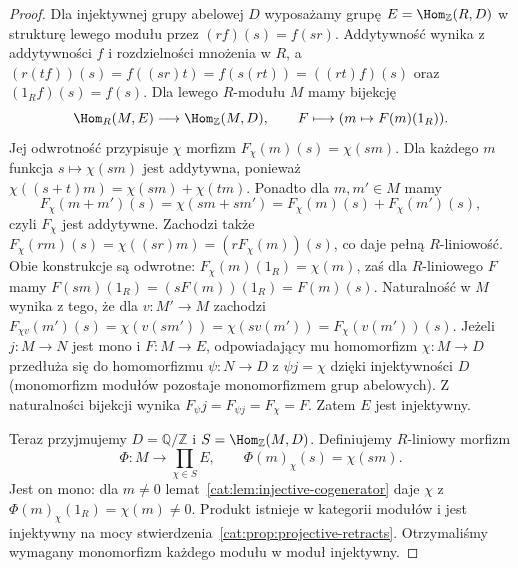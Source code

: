 \begin{proof}
Dla injektywnej grupy abelowej $D$ wyposażamy grupę $E=\Hom_{\mathbb Z}(R,D)$ w strukturę lewego modułu przez $(rf)(s)=f(sr)$. Addytywność wynika z addytywności $f$ i rozdzielności mnożenia w $R$, a $(r(tf))(s)=f((sr)t)=f(s(rt))=((rt)f)(s)$ oraz $(1_R f)(s)=f(s)$. Dla lewego $R$-modułu $M$ mamy bijekcję
\[
 \Hom_R(M,E)\longrightarrow\Hom_{\mathbb Z}(M,D),
 \qquad F\longmapsto (m\mapsto F(m)(1_R)).
\]
Jej odwrotność przypisuje $\chi$ morfizm $F_\chi(m)(s)=\chi(sm)$. Dla każdego $m$ funkcja $s\mapsto\chi(sm)$ jest addytywna, ponieważ $\chi((s+t)m)=\chi(sm)+\chi(tm)$. Ponadto dla $m,m'\in M$ mamy
\[
 F_\chi(m+m')(s)=\chi(sm+sm')=F_\chi(m)(s)+F_\chi(m')(s),
\]
czyli $F_\chi$ jest addytywne. Zachodzi także
$F_\chi(rm)(s)=\chi((sr)m)=(rF_\chi(m))(s)$, co daje pełną $R$-liniowość.
Obie konstrukcje są odwrotne: $F_\chi(m)(1_R)=\chi(m)$, zaś dla $R$-liniowego $F$ mamy $F(sm)(1_R)=(sF(m))(1_R)=F(m)(s)$. Naturalność w $M$ wynika z tego, że dla $v:M'\to M$ zachodzi $F_{\chi v}(m')(s)=\chi(v(sm'))=\chi(sv(m'))=F_\chi(v(m'))(s)$.
Jeżeli $j:M\to N$ jest mono i $F:M\to E$, odpowiadający mu homomorfizm $\chi:M\to D$ przedłuża się do homomorfizmu $\psi:N\to D$ z $\psi j=\chi$ dzięki injektywności $D$ (monomorfizm modułów pozostaje monomorfizmem grup abelowych). Z naturalności bijekcji wynika $F_\psi j=F_{\psi j}=F_\chi=F$. Zatem $E$ jest injektywny.

Teraz przyjmujemy $D=\mathbb Q/\mathbb Z$ i $S=\Hom_{\mathbb Z}(M,D)$. Definiujemy $R$-liniowy morfizm
\[
 \Phi:M\longrightarrow\prod_{\chi\in S}E,\qquad
 \Phi(m)_\chi(s)=\chi(sm).
\]
Jest on mono: dla $m\ne0$ lemat~\ref{cat:lem:injective-cogenerator} daje $\chi$ z $\Phi(m)_\chi(1_R)=\chi(m)\ne0$. Produkt istnieje w kategorii modułów i jest injektywny na mocy stwierdzenia~\ref{cat:prop:projective-retracts}. Otrzymaliśmy wymagany monomorfizm każdego modułu w moduł injektywny.
\end{proof}

